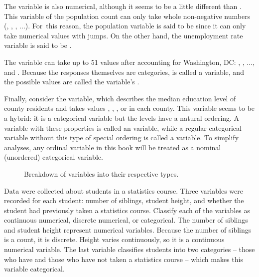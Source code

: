The  variable is also numerical, although it seems
to be a little different than .
This variable of the population count can only take whole
non-negative numbers (, , , ...).
For~this reason, the population variable is said to be
 since it can only take numerical values
with jumps.
On the other hand, the unemployment rate variable is said
to be .

The variable  can take up to 51 values after
accounting for Washington, DC: , , ...,
and .
Because the responses themselves are categories,
 is called a  variable,
and the possible values are called the variable's .

Finally, consider the  variable,
which describes the median education level of county
residents and takes values
, ,
, or 
in each county.
This variable seems to be a hybrid: it is a categorical variable
but the levels have a natural ordering.
A variable with these properties is called an 
variable, while a regular categorical variable without this
type of special ordering is called a  variable.
To simplify analyses, any ordinal variable in this book will
be treated as a nominal (unordered) categorical variable.

\begin{figure}
  \centering
  \caption{Breakdown of variables into their respective types.}
  \label{variables}
\end{figure}

\begin{examplewrap}
\begin{nexample}{Data were collected about students
    in a statistics course.
    Three variables were recorded for each student:
    number of siblings, student height, and whether
    the student had previously taken a statistics course.
    Classify each of the variables as continuous numerical,
    discrete numerical, or categorical.}
  The number of siblings and student height represent
  numerical variables.
  Because the number of siblings is a count, it is discrete.
  Height varies continuously, so it is a continuous numerical
  variable.
  The last variable classifies students into two categories
  -- those who have and those who have not taken a statistics
  course -- which makes this variable categorical.
\end{nexample}
\end{examplewrap}

